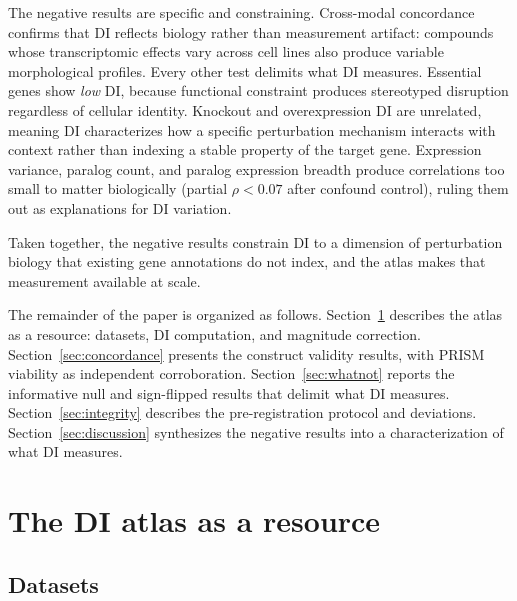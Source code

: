 \documentclass[11pt]{article}
\begin{document}
The negative results are specific and constraining.  Cross-modal concordance confirms
that DI reflects biology rather than measurement artifact: compounds
whose transcriptomic effects vary across cell lines also produce
variable morphological profiles.  Every other test delimits what DI
measures.  Essential genes show \emph{low} DI, because functional
constraint produces stereotyped disruption regardless of cellular
identity.  Knockout and overexpression DI are unrelated, meaning DI
characterizes how a specific perturbation mechanism interacts with
context rather than indexing a stable property of the target gene.
Expression variance, paralog count, and paralog expression breadth
produce correlations too small to matter biologically (partial
$\rho < 0.07$ after confound control), ruling them out as explanations
for DI variation.

Taken together, the negative results constrain DI to a dimension of
perturbation biology that existing gene annotations do not index, and
the atlas makes that measurement available at scale.

The remainder of the paper is organized as follows.
Section~\ref{sec:atlas} describes the atlas as a resource: datasets,
DI computation, and magnitude correction.
Section~\ref{sec:concordance} presents the construct validity results,
with PRISM viability as independent corroboration.
Section~\ref{sec:whatnot} reports the informative null and sign-flipped
results that delimit what DI measures.
Section~\ref{sec:integrity} describes the pre-registration protocol and
deviations.
Section~\ref{sec:discussion} synthesizes the negative results into a
characterization of what DI measures.


\section{The DI atlas as a resource}
\label{sec:atlas}

\subsection{Datasets}
\end{document}

